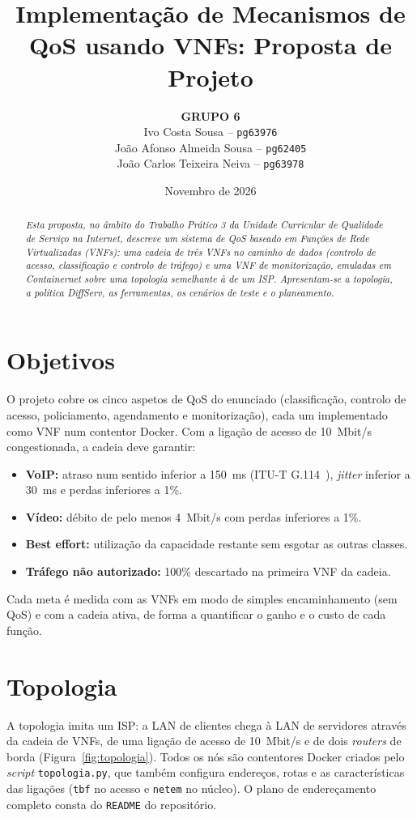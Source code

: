 \documentclass[11pt, a4paper]{article}
\title{\textbf{Implementação de Mecanismos de QoS usando VNFs: Proposta de Projeto}}
\author{
  \textbf{GRUPO 6} \\[0.4cm]
  Ivo Costa Sousa -- \texttt{pg63976} \\[0.15cm]
  João Afonso Almeida Sousa -- \texttt{pg62405} \\[0.15cm]
  João Carlos Teixeira Neiva -- \texttt{pg63978} \\[0.15cm]
}
\date{Novembro de 2026}
\begin{document}
\maketitle

\begin{abstract}
\textit{Esta proposta, no âmbito do Trabalho Prático 3 da Unidade Curricular de Qualidade de Serviço na Internet, descreve um sistema de QoS baseado em Funções de Rede Virtualizadas (VNFs): uma cadeia de três VNFs no caminho de dados (controlo de acesso, classificação e controlo de tráfego) e uma VNF de monitorização, emuladas em Containernet sobre uma topologia semelhante à de um ISP. Apresentam-se a topologia, a política DiffServ, as ferramentas, os cenários de teste e o planeamento.}
\end{abstract}

\section{Objetivos}
O projeto cobre os cinco aspetos de QoS do enunciado (classificação, controlo de acesso, policiamento, agendamento e monitorização), cada um implementado como VNF num contentor Docker. Com a ligação de acesso de 10~Mbit/s congestionada, a cadeia deve garantir:
\begin{itemize}
    \item \textbf{VoIP:} atraso num sentido inferior a 150~ms (ITU-T G.114~\cite{g114}), \textit{jitter} inferior a 30~ms e perdas inferiores a 1\%.
    \item \textbf{Vídeo:} débito de pelo menos 4~Mbit/s com perdas inferiores a 1\%.
    \item \textbf{Best effort:} utilização da capacidade restante sem esgotar as outras classes.
    \item \textbf{Tráfego não autorizado:} 100\% descartado na primeira VNF da cadeia.
\end{itemize}
Cada meta é medida com as VNFs em modo de simples encaminhamento (sem QoS) e com a cadeia ativa, de forma a quantificar o ganho e o custo de cada função.

\section{Topologia}
A topologia imita um ISP: a LAN de clientes chega à LAN de servidores através da cadeia de VNFs, de uma ligação de acesso de 10~Mbit/s e de dois \textit{routers} de borda (Figura~\ref{fig:topologia}). Todos os nós são contentores Docker criados pelo \textit{script} \texttt{topologia.py}, que também configura endereços, rotas e as características das ligações (\texttt{tbf} no acesso e \texttt{netem} no núcleo). O plano de endereçamento completo consta do \texttt{README} do repositório.
\end{document}
